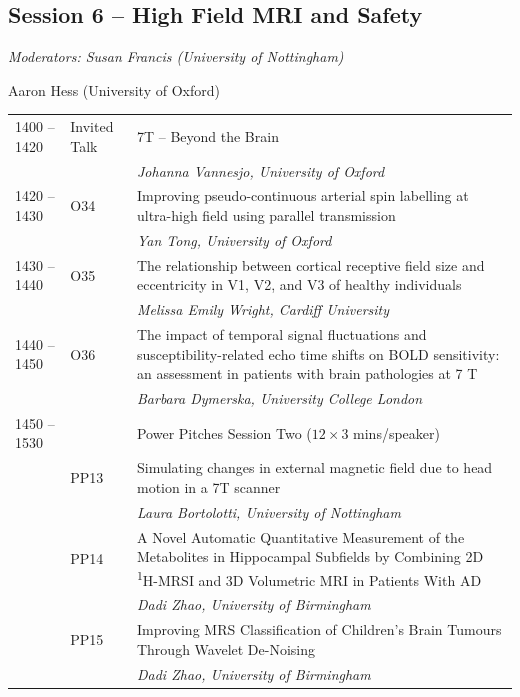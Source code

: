 \documentclass[a5paper,10pt,twoside,onecolumn,openany,helvetica,showtrims]{memoir}
\newlength{\JackBoxOne}
\newlength{\JackBoxTwo}
\newlength{\JackBoxThree}
\newlength{\LittleSkip}
\newcommand{\talkauthor}[1]{\small\emph{#1}}
\begin{document}
\subsection*{Session 6 -- High Field MRI and Safety}
\begin{flushright}
\itshape Moderators: Susan Francis (University of Nottingham) 

Aaron Hess (University of Oxford)
\end{flushright}
\noindent\hspace{-0.75em}\begin{longtable}{p{\JackBoxOne}p{\JackBoxTwo}p{\JackBoxThree}}
1400 -- 1420 & Invited Talk & 7T -- Beyond the Brain\\
& & \talkauthor{Johanna Vannesjo, University of Oxford}\\
1420 -- 1430 & O34 & Improving pseudo-continuous arterial spin labelling at ultra-high field using parallel transmission \\ 
& & \talkauthor{Yan Tong, University of Oxford} \\ 
1430 -- 1440 & O35 &  The relationship between cortical receptive field size and eccentricity in V1, V2, and V3 of healthy individuals \\ 
& & \talkauthor{Melissa Emily Wright, Cardiff University} \\ 
1440 -- 1450 & O36 & The impact of temporal signal fluctuations and susceptibility-related echo time shifts on BOLD sensitivity: an assessment in patients with brain pathologies at 7 T\\
& & \talkauthor{Barbara Dymerska, University College London}\\[\LittleSkip]
1450 -- 1530 &  & Power Pitches Session Two ($12\times3$ mins/speaker) \\[2\LittleSkip]
 & PP13 & Simulating changes in external magnetic field due to head motion in a 7T scanner\\
 & & \talkauthor{Laura Bortolotti, University of Nottingham} \\ 
 & PP14 & A Novel Automatic Quantitative Measurement of the Metabolites in Hippocampal Subfields by Combining 2D \textsuperscript{1}H-MRSI and 3D Volumetric MRI in Patients With AD \\ 
 & & \talkauthor{Dadi Zhao, University of Birmingham} \\ 
 & PP15 & Improving MRS Classification of Children's Brain Tumours Through Wavelet De-Noising \\ 
 & & \talkauthor{Dadi Zhao, University of Birmingham} \\ 

\end{longtable}
\end{document}
